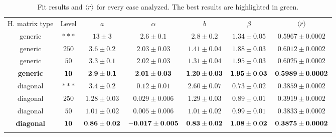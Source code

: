 \documentclass[pra, onecolumn, notitlepage, floats, 11pt]{revtex4-1}
\begin{document}
\setlength{\tabcolsep}{6pt}
\begin{table}[!h]
    \begin{tabular}{ccccccc}
        \toprule
        H. matrix type  &   Level       &   \( a \) &   \( \alpha \)    &   \( b \) &   \( \beta \) &   \( \expval{r} \)    \\
        \colrule
        generic         &   \( *** \)   &   \( 13    \pm 3    \)    &   \( 2.6   \pm 0.1   \)   &   \( 2.8  \pm 0.2  \) &   \( 1.34 \pm 0.05 \) &   \( 0.5967 \pm 0.0002 \)   \\
        generic         &   \( 250 \)   &   \(  3.6  \pm 0.2  \)    &   \( 2.03  \pm 0.03  \)   &   \( 1.41 \pm 0.04 \) &   \( 1.88 \pm 0.03 \) &   \( 0.6012 \pm 0.0002 \)   \\
        generic         &   \(  50 \)   &   \(  3.3  \pm 0.1  \)    &   \( 2.02  \pm 0.03  \)   &   \( 1.31 \pm 0.04 \) &   \( 1.95 \pm 0.03 \) &   \( 0.6025 \pm 0.0002 \)   \\
        {\bf\color{dartmouthgreen}generic}    &
        {\bf\color{dartmouthgreen}\(\bf 10 \)}   &
        {\bf\color{dartmouthgreen}\(\bf  2.9  \pm 0.1  \)}   &
        {\bf\color{dartmouthgreen}\(\bf 2.01  \pm 0.03 \)}   &
        {\bf\color{dartmouthgreen}\(\bf 1.20 \pm 0.03 \)}    &
        {\bf\color{dartmouthgreen}\(\bf 1.95 \pm 0.03 \)}    &
        {\bf\color{dartmouthgreen}\(\bf 0.5989 \pm 0.0002 \)}\\
        \colrule
        diagonal        &   \( *** \)   &   \(  3.4  \pm 0.2  \)    &   \( 0.12  \pm 0.01  \)   &   \( 2.60 \pm 0.07 \) &   \( 0.73 \pm 0.02 \) &   \( 0.3859 \pm 0.0002 \)   \\
        diagonal        &   \( 250 \)   &   \(  1.28 \pm 0.03 \)    &   \( 0.029 \pm 0.006 \)   &   \( 1.29 \pm 0.03 \) &   \( 0.89 \pm 0.01 \) &   \( 0.3919 \pm 0.0002 \)   \\
        diagonal        &   \(  50 \)   &   \(  1.01 \pm 0.02 \)    &   \( 0.005 \pm 0.006 \)   &   \( 1.01 \pm 0.02 \) &   \( 0.99 \pm 0.01 \) &   \( 0.3833 \pm 0.0002 \)   \\
        {\bf\color{dartmouthgreen}diagonal}   &
        {\bf\color{dartmouthgreen}\(\bf 10 \)}   &
        {\bf\color{dartmouthgreen}\(\bf  0.86 \pm 0.02 \)}   &
        {\bf\color{dartmouthgreen}\(\bf -0.017 \pm 0.005 \)} &
        {\bf\color{dartmouthgreen}\(\bf 0.83 \pm 0.02 \)}    &
        {\bf\color{dartmouthgreen}\(\bf 1.08 \pm 0.02 \)}    &
        {\bf\color{dartmouthgreen}\(\bf 0.3875 \pm 0.0002 \)}\\
        \botrule
    \end{tabular}
    \caption{Fit results and \( \expval{r} \) for every case analyzed. The best results are highlighted in green.}
    \label{tab:05_R_1}
\end{table}
\end{document}
